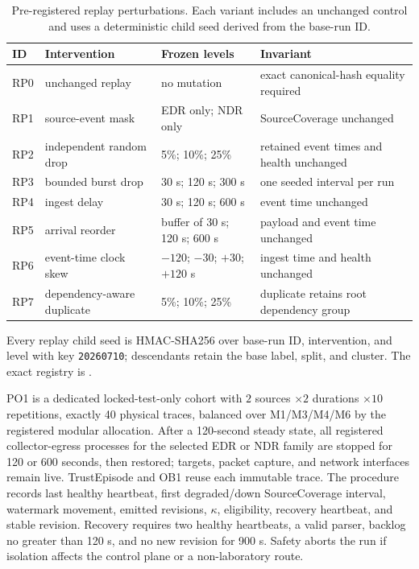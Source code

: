 \begin{table}[t]
\caption{Pre-registered replay perturbations. Each variant includes an unchanged control and
uses a deterministic child seed derived from the base-run ID.}
\label{tab:perturbation-grid}
\centering
\small
\begin{tabular}{p{}p{}p{}p{}}
\toprule
\textbf{ID} & \textbf{Intervention} & \textbf{Frozen levels} & \textbf{Invariant} \\
\midrule
RP0 & unchanged replay & no mutation & exact canonical-hash equality required \\
RP1 & source-event mask & EDR only; NDR only & SourceCoverage unchanged \\
RP2 & independent random drop & 5\%; 10\%; 25\% & retained event times and health unchanged \\
RP3 & bounded burst drop & 30 s; 120 s; 300 s & one seeded interval per run \\
RP4 & ingest delay & 30 s; 120 s; 600 s & event time unchanged \\
RP5 & arrival reorder & buffer of 30 s; 120 s; 600 s & payload and event time unchanged \\
RP6 & event-time clock skew & $-120$; $-30$; $+30$; $+120$ s & ingest time and health unchanged \\
RP7 & dependency-aware duplicate & 5\%; 10\%; 25\% & duplicate retains root dependency group \\
\bottomrule
\end{tabular}
\end{table}

Every replay child seed is HMAC-SHA256 over base-run ID, intervention, and level with key
\texttt{20260710}; descendants retain the base label, split, and cluster. The exact registry is
.

PO1 is a dedicated locked-test-only cohort with
$2$ sources $\times2$ durations $\times10$ repetitions, exactly 40 physical traces, balanced
over M1/M3/M4/M6 by the registered modular allocation. After a 120-second steady state, all
registered collector-egress processes for the selected EDR or NDR family are stopped for 120
or 600 seconds, then restored; targets, packet capture, and network interfaces remain live.
TrustEpisode and OB1 reuse each immutable trace. The procedure records last healthy heartbeat, first degraded/down
SourceCoverage interval, watermark movement, emitted revisions, $\kappa$, eligibility,
recovery heartbeat, and stable revision. Recovery requires two healthy heartbeats, a valid
parser, backlog no greater than 120 s, and no new revision for 900 s. Safety aborts the run if
isolation affects the control plane or a non-laboratory route.

